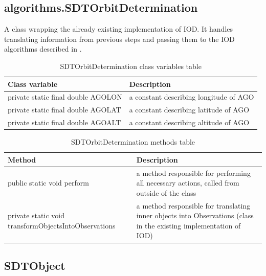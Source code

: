 \newpage

\subsection{algorithms.SDTOrbitDetermination}

	A class wrapping the already existing implementation of IOD. It handles translating information from previous steps and passing them to the IOD algorithms described in .
	
\begin{table}[H]
\centering
\setlength{\extrarowheight}{2pt}
\begin{tabularx}{\textwidth}{|X|X|}
\hline
\textbf{Class variable} & \textbf{Description} \\ \hline
private static final double \mbox{AGOLON} & a constant describing longitude of AGO \\ \hline
private static final double \mbox{AGOLAT} & a constant describing latitude of AGO\\ \hline
private static final double \mbox{AGOALT} & a constant describing altitude of AGO\\ \hline
\end{tabularx}
\caption{SDTOrbitDetermination class variables table}
\label{tab:class_variables_OD}
\end{table}

\begin{table}[H]
\centering
\setlength{\extrarowheight}{2pt}
\begin{tabularx}{\textwidth}{|X|X|}
\hline
\textbf{Method} & \textbf{Description} \\ \hline
public static void \mbox{perform} & a method responsible for performing all necessary actions, called from outside of the class \\ \hline
private static void \mbox{transformObjectsIntoObservations} & a method responsible for translating inner objects into Observations (class in the existing implementation of IOD)\\ \hline
\end{tabularx}
\caption{SDTOrbitDetermination methods table}
\label{tab:class_methods_OD}
\end{table}

\newpage

\subsection{SDTObject}\label{subsec:object}

